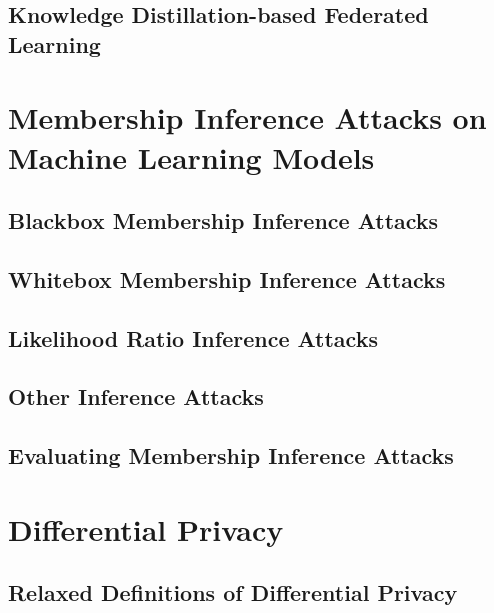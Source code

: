 \subsection{Knowledge Distillation-based Federated Learning}
\label{sec:kdfl}




\section{Membership Inference Attacks on Machine Learning Models}
\label{sec:mia}

\subsection{Blackbox Membership Inference Attacks}
\label{sec:blackboxmia}

\subsection{Whitebox Membership Inference Attacks}
\label{sec:whiteboxmia}

\subsection{Likelihood Ratio Inference Attacks}
\label{sec:lira}


\subsection{Other Inference Attacks}
\label{sec:othermia}

\subsection{Evaluating Membership Inference Attacks}
\label{sec:evalmia}



\section{Differential Privacy}
\label{sec:dp}

\subsection{Relaxed Definitions of Differential Privacy}
\label{sec:relaxeddp}




